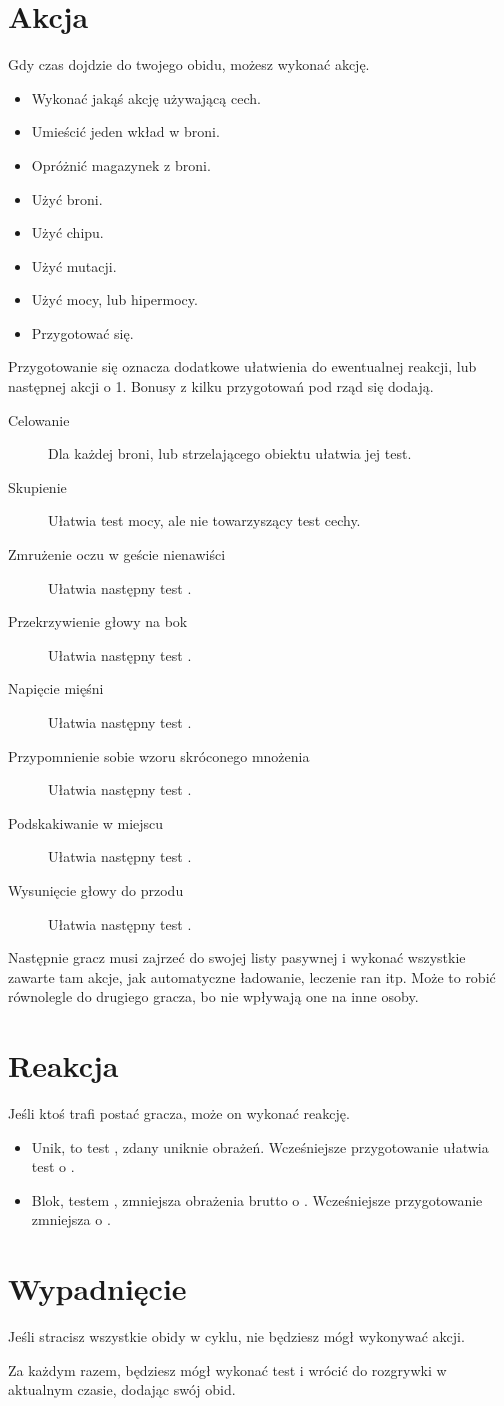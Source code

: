 \section{Akcja}
Gdy czas dojdzie do twojego obidu, możesz wykonać akcję.
\begin{itemize}
	\item Wykonać jakąś akcję używającą cech.
	\item Umieścić jeden wkład w broni.
	\item Opróżnić magazynek z broni.
	\item Użyć broni.
	\item Użyć chipu.
	\item Użyć mutacji.
	\item Użyć mocy, lub hipermocy.
	\item Przygotować się.
\end{itemize}
Przygotowanie się oznacza dodatkowe ułatwienia do ewentualnej reakcji, lub następnej akcji o 1. Bonusy z kilku przygotowań pod rząd się dodają.
\begin{description}
	\item[Celowanie] Dla każdej broni, lub strzelającego obiektu ułatwia jej test.
	\item[Skupienie] Ułatwia test mocy, ale nie towarzyszący test cechy.
	\item[Zmrużenie oczu w geście nienawiści] Ułatwia następny test \abh{}.
	\item[Przekrzywienie głowy na bok] Ułatwia następny test \abt{}.
	\item[Napięcie mięśni] Ułatwia następny test \abs{}.
	\item[Przypomnienie sobie wzoru skróconego mnożenia] Ułatwia następny test \abi{}.
	\item[Podskakiwanie w miejscu] Ułatwia następny test \aba{}.
	\item[Wysunięcie głowy do przodu] Ułatwia następny test \abp{}.
\end{description}


Następnie gracz musi zajrzeć do swojej listy pasywnej i wykonać wszystkie zawarte tam akcje, jak automatyczne ładowanie, leczenie ran itp.
Może to robić równolegle do drugiego gracza, bo nie wpływają one na inne osoby.

\section{Reakcja}
Jeśli ktoś trafi postać gracza, może on wykonać reakcję.
\begin{itemize}
	\item Unik, to test \aba{}, zdany uniknie obrażeń. Wcześniejsze przygotowanie ułatwia test o \diiii{}.
	\item Blok, testem \abs{}, zmniejsza obrażenia brutto o \dvi{}. Wcześniejsze przygotowanie zmniejsza o \dx{}.
\end{itemize}

\section{Wypadnięcie}
Jeśli stracisz wszystkie obidy w cyklu, nie będziesz mógł wykonywać akcji.

Za każdym razem, będziesz mógł wykonać test \abp{} i wrócić do rozgrywki w aktualnym czasie, dodając swój obid.


